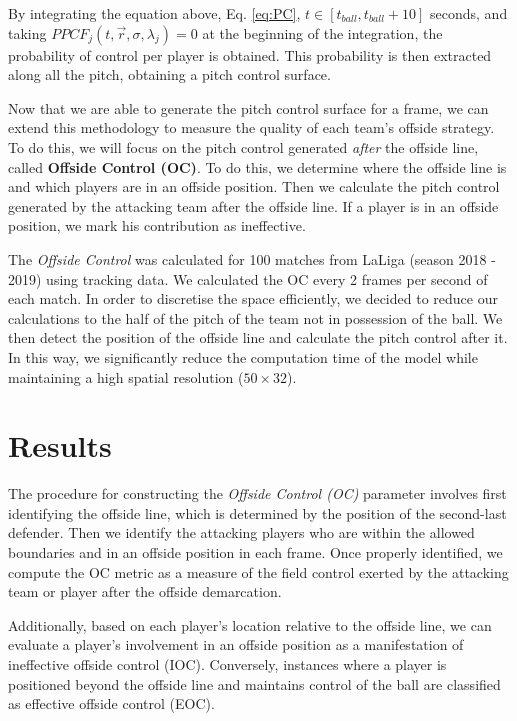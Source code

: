 \documentclass[
  10pt,
  twoside,nohyper]{book}
\begin{document}
By integrating the equation above, Eq. \eqref{eq:PC}, \(t \in \left[ t_{ball},t_{ball} + 10 \right]\) seconds, and taking \(P P C F_j\left(t, \vec{r} , \sigma, \lambda_j\right) = 0\) at the beginning of the integration, the probability of control per player is obtained. This probability is then extracted along all the pitch, obtaining a pitch control surface.

Now that we are able to generate the pitch control surface for a frame, we can extend this methodology to measure the quality of each team's offside strategy. To do this, we will focus on the pitch control generated \emph{after} the offside line, called \textbf{Offside Control (OC)}. To do this, we determine where the offside line is and which players are in an offside position. Then we calculate the pitch control generated by the attacking team after the offside line. If a player is in an offside position, we mark his contribution as ineffective.

The \emph{Offside Control} was calculated for 100 matches from LaLiga (season 2018 - 2019) using tracking data. We calculated the OC every 2 frames per second of each match. In order to discretise the space efficiently, we decided to reduce our calculations to the half of the pitch of the team not in possession of the ball. We then detect the position of the offside line and calculate the pitch control after it. In this way, we significantly reduce the computation time of the model while maintaining a high spatial resolution (\(50 \times 32\)).

\chapter{Results}\label{results}

The procedure for constructing the \emph{Offside Control (OC)} parameter involves first identifying the offside line, which is determined by the position of the second-last defender. Then we identify the attacking players who are within the allowed boundaries and in an offside position in each frame. Once properly identified, we compute the OC metric as a measure of the field control exerted by the attacking team or player after the offside demarcation.

Additionally, based on each player's location relative to the offside line, we can evaluate a player's involvement in an offside position as a manifestation of ineffective offside control (IOC). Conversely, instances where a player is positioned beyond the offside line and maintains control of the ball are classified as effective offside control (EOC).
\end{document}
